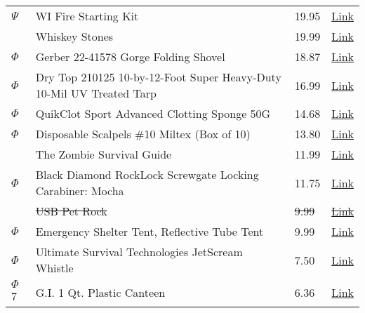 \documentclass[12pt]{article}
\begin{document}
\begin{longtable}{ | p{1.3cm} | p{12cm} | l | l |}
$\Psi$ & WI Fire Starting Kit & 19.95 & \href{http://wildernessinnovation.com/survival-supplies/survival-items/wi-fire-starting-kit/}{Link} \\
& Whiskey Stones & 19.99 & \href{http://www.thinkgeek.com/homeoffice/kitchen/ba37/?srp=1}{Link} \\
$\Phi$ & Gerber 22-41578 Gorge Folding Shovel & 18.87 & \href{http://www.amazon.com/Gerber-22-41578-Gorge-Folding-Shovel/dp/B000WZCSTO/ref=wl_it_dp_o_npd?ie=UTF8&coliid=I1ZJ1LT6IE8PL&colid=8BFL6AZQK4C2}{Link} \\
$\Phi$ & Dry Top 210125 10-by-12-Foot Super Heavy-Duty 10-Mil UV Treated Tarp & 16.99 & \href{http://www.amazon.com/Dry-Top-210125-Heavy-Duty-Reversible/dp/B0002Z3NAC/ref=wl_it_dp_o_npd?ie=UTF8&coliid=I3HMFRW73GO9IR&colid=8BFL6AZQK4C2}{Link} \\
$\Phi$ & QuikClot Sport Advanced Clotting Sponge 50G & 14.68 & \href{http://www.amazon.com/Quikclot-Advanced-Clotting-Bleeding-Package/dp/B001BCNTHC/ref=sr_1_1?ie=UTF8&qid=1324835697&sr=8-1}{Link} \\
$\Phi$ & Disposable Scalpels \#10 Miltex (Box of 10) & 13.80 & \href{http://www.amazon.com/Disposable-Scalpels-10-Miltex-Box/dp/B0008F6HFY/ref=sr_1_1?ie=UTF8&qid=1324835671&sr=8-1}{Link} \\
& The Zombie Survival Guide & 11.99 & \href{http://www.thinkgeek.com/interests/giftsunder20/7838/#tabs}{Link} \\
$\Phi$ & Black Diamond RockLock Screwgate Locking Carabiner: Mocha & 11.75 & \href{http://www.amazon.com/Black-Diamond-RockLock-Screwgate-Carabiner/dp/B000LGJFYK/ref=wl_it_dp_o_npd?ie=UTF8&coliid=I33SFHSKFT6SWM&colid=8BFL6AZQK4C2}{Link} \\
& \sout{USB Pet Rock} & \sout{9.99} & \href{http://www.thinkgeek.com/computing/usb-gadgets/c208/}{\sout{Link}} \\
$\Phi$ & Emergency Shelter Tent, Reflective Tube Tent & 9.99 & \href{http://www.amazon.com/Emergency-Shelter-Reflective-Weather-Zone/dp/B000Y9BRCM/ref=wl_it_dp_o_npd?ie=UTF8&coliid=I1FLRSXD1Y4B54&colid=8BFL6AZQK4C2}{Link} \\
$\Phi$ & Ultimate Survival Technologies JetScream Whistle & 7.50 & \href{http://www.amazon.com/Ultimate-Survival-Technologies-Scream-Whistle/dp/B002VCONVW/ref=wl_it_dp_o_npd?ie=UTF8&coliid=I3FM65Q2ZN2I6L&colid=8BFL6AZQK4C2}{Link} \\
$\Phi$ 7 & G.I. 1 Qt. Plastic Canteen & 6.36 & \href{http://www.amazon.com/606-G-I-BLACK-PLASTIC-CANTEEN/dp/B000RK2XU8/ref=pd_sim_a_4}{Link} \\

\end{longtable}
\end{document}
